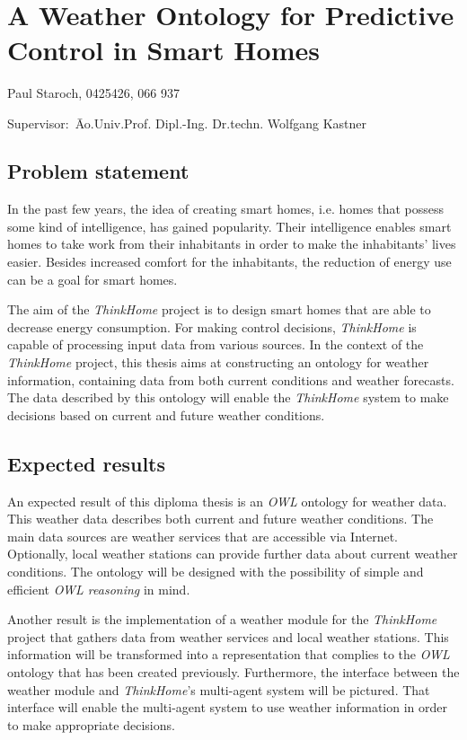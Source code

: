 \documentclass{scrartcl}
\begin{document}
~\vspace{0.5cm}
\section*{A Weather Ontology for Predictive Control in Smart Homes}
Paul Staroch, 0425426, 066 937
\begin{tabbing}
Supervisor:\ \= Ao.Univ.Prof. Dipl.-Ing. Dr.techn. Wolfgang Kastner\\
\end{tabbing}

\subsection*{Problem statement}
In the past few years, the idea of creating smart homes, i.e. homes that possess some kind of intelligence, has gained popularity.
Their intelligence enables smart homes to take work from their inhabitants in order to make the inhabitants' lives easier.
Besides increased comfort for the inhabitants, the reduction of energy use can be a goal for smart homes.

The aim of the \textit{ThinkHome} project \cite{CR2011-TH_Journal} \cite{CR2010-DEST_ThinkHome} is to design smart homes that are able to decrease energy consumption.
For making control decisions, \textit{ThinkHome} is capable of processing input data from various sources.
In the context of the \textit{ThinkHome} project, this thesis aims at constructing an ontology for weather information, containing data from both current conditions and weather forecasts.
The data described by this ontology will enable the \textit{ThinkHome} system to make decisions based on current and future weather conditions.

\subsection*{Expected results}
An expected result of this diploma thesis is an \textit{OWL} ontology for weather data. This weather data describes both current and future weather conditions.
The main data sources are weather services that are accessible via Internet. Optionally, local weather stations can provide further data about current weather conditions.
The ontology will be designed with the possibility of simple and efficient \textit{OWL reasoning} in mind.

Another result is the implementation of a weather module for the \textit{ThinkHome} project that gathers data from weather services and local weather stations.
This information will be transformed into a representation that complies to the \textit{OWL} ontology that has been created previously.
Furthermore, the interface between the weather module and \textit{ThinkHome}'s multi-agent system will be pictured.
That interface will enable the multi-agent system to use weather information in order to make appropriate decisions.
\end{document}
